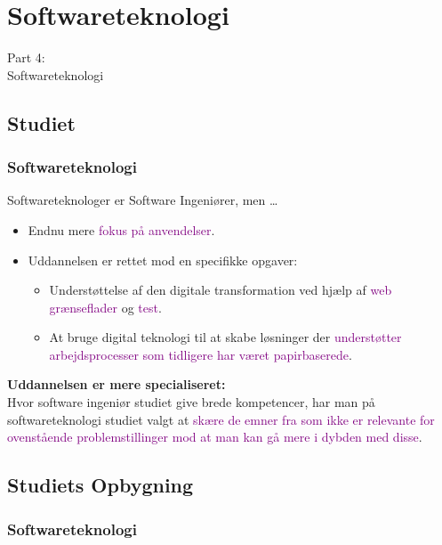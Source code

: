 {
\renewcommand{\bgcolor}{st}

\section{Softwareteknologi}
\begin{frame}
    \vspace{25mm}
    \begin{center}
        \Huge{Part 4:\\Softwareteknologi}
    \end{center}
\end{frame}

\subsection{Studiet}
\begin{frame}[fragile]
  \frametitle{Softwareteknologi }
  \vspace{3mm}
  Softwareteknologer er Software Ingeniører, men \ldots
  \begin{itemize}
    \item Endnu mere \textcolor{purple}{fokus på anvendelser}.
    \item Uddannelsen er rettet mod en specifikke opgaver:
      \begin{itemize}
        \item Understøttelse af den digitale transformation ved hjælp af \textcolor{purple}{web grænseflader} og \textcolor{purple}{test}.
        \item At bruge digital teknologi til at skabe løsninger der \textcolor{purple}{understøtter arbejdsprocesser som tidligere har været papirbaserede}.
      \end{itemize}
  \end{itemize}
  
  \pause
  \vspace{5mm}
  \textbf{Uddannelsen er mere specialiseret:} \\
  Hvor software ingeniør studiet give brede kompetencer, har man på softwareteknologi studiet valgt at \textcolor{purple}{skære de emner fra som ikke er relevante for ovenstående problemstillinger mod at man kan gå mere i dybden med disse}.
\end{frame}

\subsection{Studiets Opbygning}
\begin{frame}[fragile]
  \frametitle{Softwareteknologi }
  \vspace{-2mm}
  

\end{frame}}

